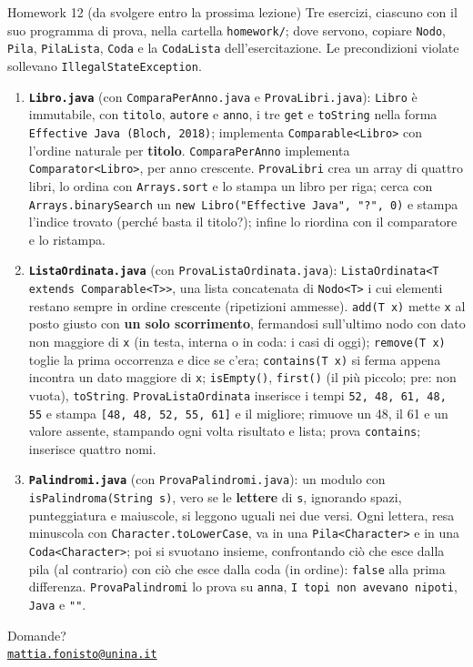\documentclass[10pt,aspectratio=169,xcolor={table}]{beamer}
\begin{document}
\begin{frame}{Homework 12 (da svolgere entro la prossima lezione)}
\footnotesize\setlength{\parskip}{0pt}
Tre esercizi, ciascuno con il suo programma di prova, nella cartella \texttt{homework/}; dove servono, copiare \texttt{Nodo}, \texttt{Pila}, \texttt{PilaLista}, \texttt{Coda} e la \texttt{CodaLista} dell'esercitazione. Le precondizioni violate sollevano \texttt{IllegalStateException}.
\begin{enumerate}\itemsep=3pt
    \item \textbf{\texttt{Libro.java}} (con \texttt{ComparaPerAnno.java} e \texttt{ProvaLibri.java}): \texttt{Libro} è immutabile, con \texttt{titolo}, \texttt{autore} e \texttt{anno}, i tre \texttt{get} e \texttt{toString} nella forma \texttt{Effective Java (Bloch, 2018)}; implementa \texttt{Comparable<Libro>} con l'ordine naturale per \textbf{titolo}. \texttt{ComparaPerAnno} implementa \texttt{Comparator<Libro>}, per anno crescente. \texttt{ProvaLibri} crea un array di quattro libri, lo ordina con \texttt{Arrays.sort} e lo stampa un libro per riga; cerca con \texttt{Arrays.binarySearch} un \texttt{new Libro("Effective Java", "?", 0)} e stampa l'indice trovato (perché basta il titolo?); infine lo riordina con il comparatore e lo ristampa.
    \item \textbf{\texttt{ListaOrdinata.java}} (con \texttt{ProvaListaOrdinata.java}): \texttt{ListaOrdinata<T extends Comparable<T>>}, una lista concatenata di \texttt{Nodo<T>} i cui elementi restano sempre in ordine crescente (ripetizioni ammesse). \texttt{add(T x)} mette \texttt{x} al posto giusto con \textbf{un solo scorrimento}, fermandosi sull'ultimo nodo con dato non maggiore di \texttt{x} (in testa, interna o in coda: i casi di oggi); \texttt{remove(T x)} toglie la prima occorrenza e dice se c'era; \texttt{contains(T x)} si ferma appena incontra un dato maggiore di \texttt{x}; \texttt{isEmpty()}, \texttt{first()} (il più piccolo; pre: non vuota), \texttt{toString}. \texttt{ProvaListaOrdinata} inserisce i tempi \texttt{52, 48, 61, 48, 55} e stampa \texttt{[48, 48, 52, 55, 61]} e il migliore; rimuove un 48, il 61 e un valore assente, stampando ogni volta risultato e lista; prova \texttt{contains}; inserisce quattro nomi.
    \item \textbf{\texttt{Palindromi.java}} (con \texttt{ProvaPalindromi.java}): un modulo con \texttt{isPalindroma(String s)}, vero se le \textbf{lettere} di \texttt{s}, ignorando spazi, punteggiatura e maiuscole, si leggono uguali nei due versi. Ogni lettera, resa minuscola con \texttt{Character.toLowerCase}, va in una \texttt{Pila<Character>} e in una \texttt{Coda<Character>}; poi si svuotano insieme, confrontando ciò che esce dalla pila (al contrario) con ciò che esce dalla coda (in ordine): \texttt{false} alla prima differenza. \texttt{ProvaPalindromi} lo prova su \texttt{anna}, \texttt{I topi non avevano nipoti}, \texttt{Java} e \texttt{""}.
\end{enumerate}
\end{frame}

\begin{frame}
\begin{center}
{\Huge Domande?}\\[2em]
{\normalsize \href{mailto:mattia.fonisto@unina.it}{\texttt{mattia.fonisto@unina.it}}}
\end{center}
\end{frame}
\end{document}
